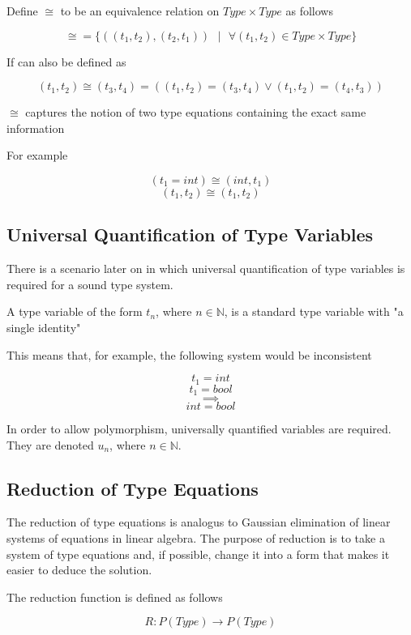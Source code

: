 \documentclass[titlepage]{article}
\begin{document}
Define $\cong$ to be an equivalence relation on $Type \times Type$ as follows

$$\cong = \{((t_1, t_2), (t_2, t_1)) \text{ } | \text{ } \forall (t_1, t_2) \in Type \times Type\}$$

If can also be defined as

$$(t_1, t_2) \cong (t_3, t_4) = ((t_1, t_2) = (t_3, t_4) \lor (t_1, t_2) = (t_4, t_3))$$

$\cong$ captures the notion of two type equations containing the exact same information

For example

$$(t_1 = int) \cong (int, t_1)$$
$$(t_1, t_2) \cong (t_1, t_2) $$



\subsection{Universal Quantification of Type Variables}

There is a scenario later on in which universal quantification of type variables is required for a sound type system.

A type variable of the form $t_n$, where $n \in \mathbb{N}$, is a standard type variable with "a single identity"

This means that, for example, the following system would be inconsistent

$$t_1 = int$$
$$t_1 = bool$$
$$\implies$$
$$int = bool$$

In order to allow polymorphism, universally quantified variables are required. They are denoted $u_n$, where $n \in \mathbb{N}$.

\newpage

\subsection{Reduction of Type Equations}

The reduction of type equations is analogus to Gaussian elimination of linear systems of equations in linear algebra. The purpose of reduction is to take a system of type equations and, if possible, change it into a form that makes it easier to deduce the solution.

The reduction function is defined as follows

$$R: P(Type) \rightarrow P(Type)$$
\end{document}
